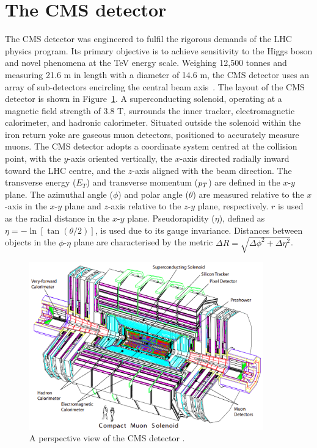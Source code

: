 \section{The CMS detector}

The \ac{CMS} detector was engineered to fulfil the rigorous demands of the \ac{LHC} physics program. 
Its primary objective is to achieve sensitivity to the Higgs boson and novel phenomena at the TeV energy scale. 
Weighing 12,500 tonnes and measuring 21.6 m in length with a diameter of 14.6 m, the \ac{CMS} detector uses an array of sub-detectors encircling the central beam axis~\cite{CMS_Setup}. 
The layout of the \ac{CMS} detector is shown in Figure~\ref{fig:CMS_Schematic}.
A superconducting solenoid, operating at a magnetic field strength of 3.8 T, surrounds the inner tracker, electromagnetic calorimeter, and hadronic calorimeter. 
Situated outside the solenoid within the iron return yoke are gaseous muon detectors, positioned to accurately measure muons. 
The \ac{CMS} detector adopts a coordinate system centred at the collision point, with the $y$-axis oriented vertically, the $x$-axis directed radially inward toward the \ac{LHC} centre, and the $z$-axis aligned with the beam direction. 
The transverse energy ($E_T$) and transverse momentum ($p_{T}$) are defined in the $x$-$y$ plane. 
The azimuthal angle ($\phi$) and polar angle ($\theta$) are measured relative to the $x$-axis in the $x$-$y$ plane and $z$-axis relative to the $z$-$y$ plane, respectively. 
$r$ is used as the radial distance in the $x$-$y$ plane.
Pseudorapidity ($\eta$), defined as $\eta = -\ln[\tan(\theta/2)]$, is used due to its gauge invariance. 
Distances between objects in the $\phi$-$\eta$ plane are characterised by the metric $\Delta R = \sqrt{\Delta\phi^2 + \Delta\eta^2}$. 

\begin{figure}[!hbtp]
    \centering
    \includegraphics[width=0.9\textwidth]{Figures/CMS_Detector.png}
    \caption[Diagram of the CMS detector.]{A perspective view of the \ac{CMS} detector \cite{CMS_Setup}.}
    \label{fig:CMS_Schematic}
\end{figure}

